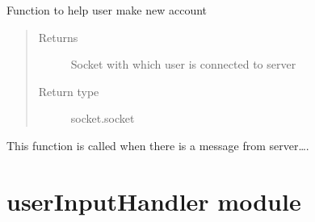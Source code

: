 \documentclass[letterpaper,10pt,english]{sphinxmanual}
\begin{document}

\begin{fulllineitems}
\label{\detokenize{app:app.signup}}
Function to help user make new account
\begin{quote}\begin{description}
\item[{Returns}] \leavevmode
Socket with which user is connected to server

\item[{Return type}] \leavevmode
socket.socket

\end{description}\end{quote}

\end{fulllineitems}


\begin{fulllineitems}
\label{\detokenize{app:app.handleMessageFromServer}}
This function is called when there is a message from server….

\end{fulllineitems}



\section{userInputHandler module}
\label{\detokenize{userInputHandler:module-userInputHandler}}\label{\detokenize{userInputHandler:userinputhandler-module}}\label{\detokenize{userInputHandler::doc}}
\end{document}

